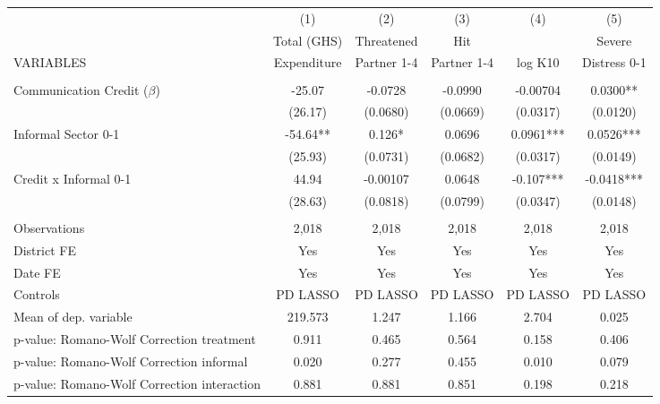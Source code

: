 \begin{tabular}{lccccc} \hline
 & (1) & (2) & (3) & (4) & (5) \\
 & Total (GHS) & Threatened & Hit &  & Severe \\
VARIABLES & Expenditure & Partner 1-4 & Partner 1-4 & log K10 & Distress 0-1 \\ \hline
 &  &  &  &  &  \\
Communication Credit ($\beta$) & -25.07 & -0.0728 & -0.0990 & -0.00704 & 0.0300** \\
 & (26.17) & (0.0680) & (0.0669) & (0.0317) & (0.0120) \\
Informal Sector 0-1 & -54.64** & 0.126* & 0.0696 & 0.0961*** & 0.0526*** \\
 & (25.93) & (0.0731) & (0.0682) & (0.0317) & (0.0149) \\
Credit x Informal 0-1 & 44.94 & -0.00107 & 0.0648 & -0.107*** & -0.0418*** \\
 & (28.63) & (0.0818) & (0.0799) & (0.0347) & (0.0148) \\
 &  &  &  &  &  \\
Observations & 2,018 & 2,018 & 2,018 & 2,018 & 2,018 \\
District FE & Yes & Yes & Yes & Yes & Yes \\
Date FE & Yes & Yes & Yes & Yes & Yes \\
Controls & PD LASSO & PD LASSO & PD LASSO & PD LASSO & PD LASSO \\
Mean of dep. variable & 219.573 & 1.247 & 1.166 & 2.704 & 0.025 \\
p-value: Romano-Wolf Correction treatment & 0.911 & 0.465 & 0.564 & 0.158 & 0.406 \\
p-value: Romano-Wolf Correction informal & 0.020 & 0.277 & 0.455 & 0.010 & 0.079 \\
 p-value: Romano-Wolf Correction interaction & 0.881 & 0.881 & 0.851 & 0.198 & 0.218 \\ \hline
\end{tabular}
